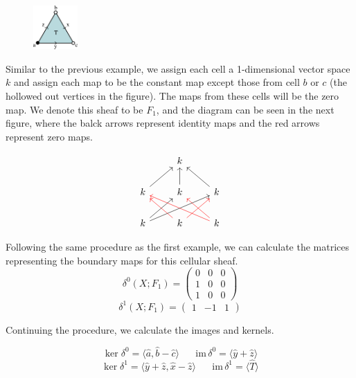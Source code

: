 \documentclass{article}
\newcommand{\im}{\textrm{im}\,}
\begin{document}
\begin{figure}[!htbp]
\centering
	\includegraphics[width=0.15\textwidth]{triangle_dir_bc.png}
\end{figure}

Similar to the previous example, we assign each cell a 1-dimensional vector space $k$ and assign each map to be the constant map except those from cell $b$ or $c$ (the hollowed out vertices in the figure). The maps from these cells will be the zero map. We denote this sheaf to be $F_1$, and the diagram can be seen in the next figure, where the balck arrows represent identity maps and the red arrows represent zero maps.

\[
\begin{tikzcd}
	& k & \\
	k \arrow{ur} & k \arrow{u} & k \arrow{ul} \\
	k \arrow{ur} \arrow{urr} & k \arrow[red]{ur} \arrow[red]{ul} & k \arrow[red]{ul} \arrow[red]{ull}
\end{tikzcd}
\]

Following the same procedure as the first example, we can calculate the matrices representing the boundary maps for this cellular sheaf.
\begin{equation}
	\delta^0(X;F_1) = \begin{pmatrix} 0 & 0 & 0 \\ 1 & 0 & 0 \\ 1 & 0 & 0 \end{pmatrix}
\end{equation}
\begin{equation}
	\delta^1(X;F_1) = \begin{pmatrix} 1 & -1 & 1 \end{pmatrix}
\end{equation}

Continuing the procedure, we calculate the images and kernels.

\begin{equation}
	\ker \delta^0 = \langle \hat{a}, \hat{b} - \hat{c} \rangle \hspace{20pt} \im \delta^0 = \langle \hat{y} + \hat{z} \rangle
\end{equation}
\begin{equation}
\ker \delta^1 = \langle \hat{y} + \hat{z}, \hat{x} - \hat{z} \rangle \hspace{20pt} \im \delta^1 = \langle \hat{T} \rangle
\end{equation}
\end{document}
